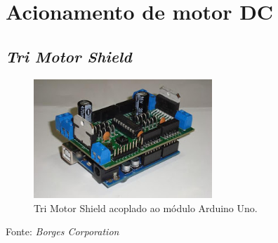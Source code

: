 








\section{Acionamento de motor DC}

\subsection{\textit{Tri Motor Shield}}

\cite{borges2019}

\begin{figure}[!htb]
  \centering
  \caption{Tri Motor Shield acoplado ao módulo Arduino Uno.}
  \label{fig:TriMotorShield}
  \includegraphics[width=0.60\textwidth]{./img/fundamentacao/TriMotorShield.jpg}
\end{figure}
Fonte: \textit{Borges \textit{Corporation}}

